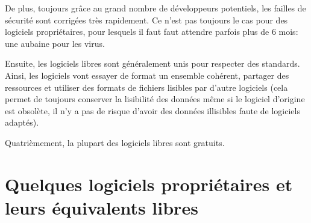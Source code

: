 \documentclass[10pt]{../fiche}
\begin{document}
De plus, toujours grâce au grand nombre de développeurs potentiels,
les failles de sécurité sont corrigées très rapidement. Ce n'est pas
toujours le cas pour des logiciels propriétaires, pour lesquels il faut
faut attendre parfois plus de 6 mois: une aubaine pour les virus.

Ensuite, les logiciels libres sont généralement unis pour respecter des
standards. Ainsi, les logiciels vont essayer de format un ensemble cohérent,
partager des ressources et utiliser des formats de fichiers lisibles par
d'autre logiciels (cela permet de toujours conserver la lisibilité des données
même si le logiciel d'origine est obsolète, il n'y a pas de risque d'avoir des
données illisibles faute de logiciels adaptés).

Quatrièmement, la plupart des logiciels libres sont gratuits.

\section*{Quelques logiciels propriétaires et leurs équivalents libres}
\end{document}
